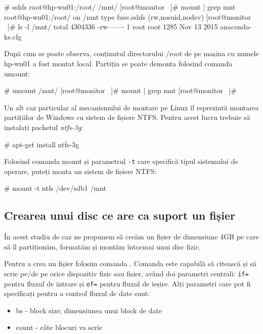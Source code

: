 \begin{screen}
# sshfs root@hp-wn01:/root/ /mnt/
[root@monitor ~]# mount | grep mnt
root@hp-wn01:/root/ on /mnt type fuse.sshfs (rw,nosuid,nodev)
[root@monitor ~]# ls -l /mnt/
total 4304336
-rw------- 1 root root       1285 Nov 13  2015 anaconda-ks.cfg
\end{screen}

După cum se poate observa, conținutul directorului /root de pe mașina cu numele
hp-wn01 a fost montat local. Partiția se poate demonta folosind comanda umount:

\begin{screen}
# umount /mnt/
[root@monitor ~]# mount | grep mnt
[root@monitor ~]#
\end{screen}


Un alt caz particular al mecanismului de montare pe Linux îl reprezintă montarea
partițiilor de Windows cu sistem de fișiere NTFS. Pentru acest lucru trebuie să
instalați pachetul \textit{ntfs-3g}:
\begin{screen}
# apt-get install ntfs-3g
\end{screen}

Folosind comanda mount și parametrul \texttt{-t} care specifică tipul sistemului
de operare, puteți monta un sistem de fișiere NTFS:

\begin{screen}
# mount -t ntfs /dev/sdb1 /mnt
\end{screen}

\subsection{Crearea unui disc ce are ca suport un fișier}
\label{sec:storage-mount-create}

În acest studiu de caz ne propunem să creăm un fișier de dimensiune 4GB pe care
să îl partiționăm, formatăm și montăm întocmai unui disc fizic.

Pentru a crea un fișier folosim comanda . Comanda  este capabilă
să citească și să scrie pe/de pe orice dispozitiv fizic sau fișier, având doi
parametri centrali: \texttt{if=} pentru fluxul de intrare și \texttt{of=} pentru
fluxul de ieșire. Alți parametri care pot fi specificați pentru a control
fluxul de date sunt:

\begin{itemize}
	\item bs - block size; dimensiunea unui block de date
	\item count - câte blocuri va scrie
\end{itemize}

